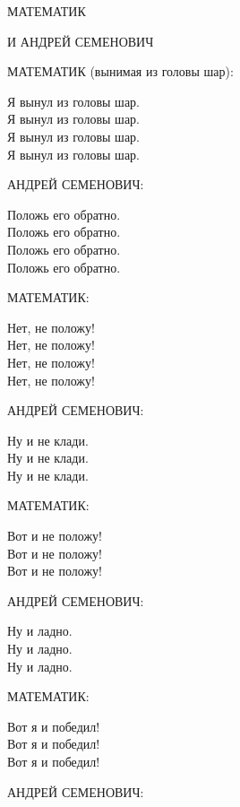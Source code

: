 МАТЕМАТИК 

	\hspace{1.9cm}
	\parbox{10cm}{И АНДРЕЙ СЕМЕНОВИЧ}

МАТЕМАТИК (вынимая из головы шар): 

	\hspace{1cm}
	\parbox{10cm}{Я вынул из головы шар. \\
	Я вынул из головы шар. \\
	Я вынул из головы шар. \\
	Я вынул из головы шар.}

АНДРЕЙ СЕМЕНОВИЧ: 

	\hspace{1cm}
	\parbox{10cm}{Положь его обратно. \\
	Положь его обратно. \\
	Положь его обратно. \\
	Положь его обратно.}

МАТЕМАТИК: 

	\hspace{1cm}
	\parbox{10cm}{Нет, не положу! \\
	Нет, не положу! \\
	Нет, не положу! \\
	Нет, не положу!}

АНДРЕЙ СЕМЕНОВИЧ: 

	\hspace{1cm}
	\parbox{10cm}{Ну и не клади. \\
	Ну и не клади. \\
	Ну и не клади.}

МАТЕМАТИК:

	\hspace{1cm}
	\parbox{10cm}{Вот и не положу! \\
	Вот и не положу! \\
	Вот и не положу!}

АНДРЕЙ СЕМЕНОВИЧ: 

	\hspace{1cm}
	\parbox{10cm}{Ну и ладно. \\
	Ну и ладно. \\
	Ну и ладно.}

МАТЕМАТИК: 

	\hspace{1cm}
	\parbox{10cm}{Вот я и победил! \\
	Вот я и победил! \\
	Вот я и победил!}

АНДРЕЙ СЕМЕНОВИЧ:

